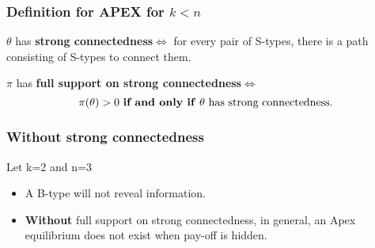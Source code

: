 \documentclass[10pt]{beamer}
\begin{document}


\begin{frame}
  \frametitle{Definition for APEX for $k<n$}


\begin{definition}
$\theta$ has \textbf{strong connectedness}$\Leftrightarrow$ for every pair of S-types, there is a path consisting of S-types to connect them.
\end{definition}  

\begin{definition}
$\pi$ has \textbf{full support on strong connectedness}$\Leftrightarrow$ 
\[\text{$\pi(\theta)>0$ \textbf{if and only if} $\theta$ has strong connectedness.}\]
\end{definition}  


\end{frame}


\begin{frame}
  \frametitle{Without strong connectedness}
Let k=\alert{2} and n=\alert{3}
\begin{center}
\end{center}

\begin{itemize}


\item A B-type will not reveal information.
\item \textbf{Without} {full support on strong connectedness}, in general, an Apex equilibrium does not exist when pay-off is hidden.

\end{itemize}
\end{frame}
\end{document}
